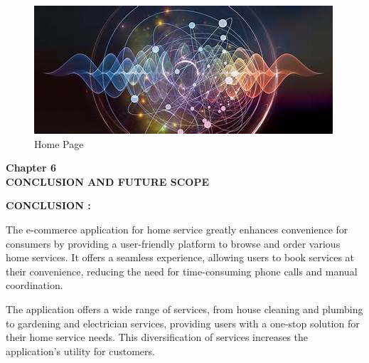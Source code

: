 \documentclass[12pt]{article}
\begin{document}
 \begin{figure}[h]
 \centering
 \includegraphics[scale=1]{Quantum}
  \caption{Home Page}
 \end{figure}
 
\clearpage


\begin{center}
 \LARGE \textbf {Chapter 6 }\\[10mm]
 \Large \textbf{CONCLUSION AND FUTURE SCOPE }\\[10mm]
 \end{center}
 \large \textbf{CONCLUSION :}\\[3mm]\par

The e-commerce application for home service greatly enhances convenience for consumers by providing a user-friendly platform to browse and order various home services. It offers a seamless experience, allowing users to book services at their convenience, reducing the need for time-consuming phone calls and manual coordination.\\[1mm]\par 
The application offers a wide range of services, from house cleaning and plumbing to gardening and electrician services, providing users with a one-stop solution for their home service needs. This diversification of services increases the application's utility for customers.\\[2mm]
\end{document}
